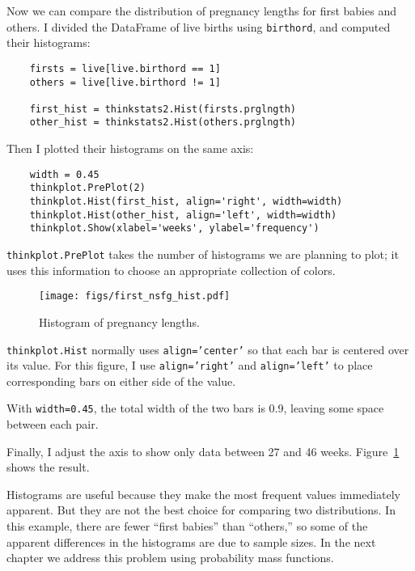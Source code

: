 \documentclass[12pt]{book}
\begin{document}
Now we can compare the distribution of pregnancy lengths for first
babies and others.  I divided the DataFrame of live births using
{\tt birthord}, and computed their histograms:

\begin{verbatim}
    firsts = live[live.birthord == 1]
    others = live[live.birthord != 1]

    first_hist = thinkstats2.Hist(firsts.prglngth)
    other_hist = thinkstats2.Hist(others.prglngth)
\end{verbatim}

Then I plotted their histograms on the same axis:

\begin{verbatim}
    width = 0.45
    thinkplot.PrePlot(2)
    thinkplot.Hist(first_hist, align='right', width=width)
    thinkplot.Hist(other_hist, align='left', width=width)
    thinkplot.Show(xlabel='weeks', ylabel='frequency')
\end{verbatim}

{\tt thinkplot.PrePlot} takes the number of histograms
we are planning to plot; it uses this information to choose
an appropriate collection of colors.

\begin{figure}
\centerline{\texttt{[image: figs/first\_nsfg\_hist.pdf]}}
\caption{Histogram of pregnancy lengths.}
\label{first_nsfg_hist}
\end{figure}

{\tt thinkplot.Hist} normally uses {\tt align='center'} so that
each bar is centered over its value.  For this figure, I use
{\tt align='right'} and {\tt align='left'} to place
corresponding bars on either side of the value.

With {\tt width=0.45}, the total width of the two bars is 0.9,
leaving some space between each pair.

Finally, I adjust the axis to show only data between 27 and 46 weeks.
Figure~\ref{first_nsfg_hist} shows the result.

Histograms are useful because they make the most frequent values
immediately apparent.  But they are not the best choice for comparing
two distributions.  In this example, there are fewer ``first babies''
than ``others,'' so some of the apparent differences in the histograms
are due to sample sizes.  In the next chapter we address this problem
using probability mass functions.
\end{document}
